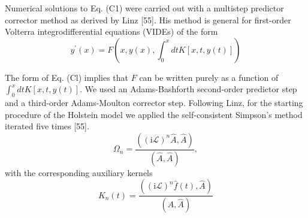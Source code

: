Numerical solutions to Eq. (C1) were carried out with a multistep predictor corrector method as derived by Linz [55]. His method is general for first-order Volterra integrodifferential equations (VIDEs) of the form
$$
y^{\prime}(x)=F\left(x, y(x), \int_0^x d t K[x, t, y(t)]\right)
$$

The form of Eq. (Cl) implies that $F$ can be written purely as a function of $\int_0^x d t K[x, t, y(t)]$. We used an Adams-Bashforth second-order predictor step and a third-order Adams-Moulton corrector step. Following Linz, for the starting procedure of the Holstein model we applied the self-consistent Simpson's method iterated five times [55].
\begin{equation}
\Omega_n=\frac{\left((\mathrm{i} \mathcal{L})^n \hat{A}, \hat{A}\right)}{(\hat{A}, \hat{A})},
\end{equation}
with the corresponding auxiliary kernels
\begin{equation}
K_n(t)=\frac{\left((\mathrm{i} \mathcal{L})^n \hat{f}(t), \hat{A}\right)}{(\hat{A}, \hat{A})}
\end{equation}
